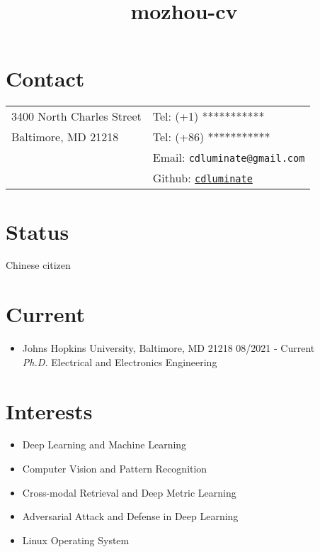 \documentclass[margin,line,pifont,palatino,courier]{res}
\begin{document}
\title{mozhou-cv}
\begin{resume}

\section{\sc Contact}

\vspace{.05in}
\begin{tabular}{@{}p{2.2in}p{2.2in}}
3400 North Charles Street & Tel: (+1) *********** \\
Baltimore, MD 21218       & Tel: (+86) *********** \\
	                      & Email: \verb+cdluminate@gmail.com+\\
			              & Github: \href{https://github.com/cdluminate}{\tt cdluminate}\\
\end{tabular}

\section{\sc Status}
Chinese citizen

\section{\sc Current}

\begin{itemize}[leftmargin=*]
\item Johns Hopkins University, Baltimore, MD 21218 \hfill 08/2021 - Current\\
	\textit{Ph.D.} Electrical and Electronics Engineering
\end{itemize}

\section{\sc Interests}
\begin{itemize}[noitemsep, leftmargin=*]
	\item Deep Learning and Machine Learning
    \item Computer Vision and Pattern Recognition
	\item Cross-modal Retrieval and Deep Metric Learning 
	\item Adversarial Attack and Defense in Deep Learning
	\item Linux Operating System
\end{itemize}
 

\end{resume}
\end{document}
